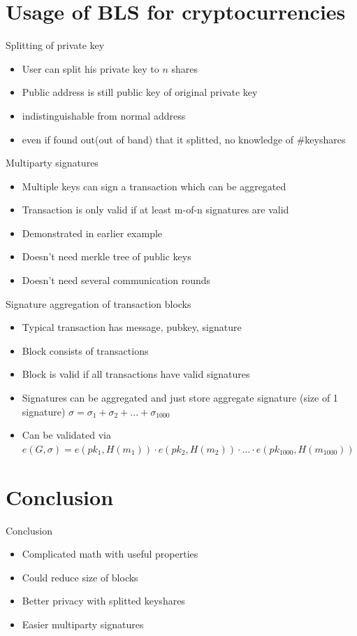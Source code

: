 \documentclass{beamer}
\begin{document}
\section{Usage of BLS for cryptocurrencies}
\begin{frame}{Splitting of private key}
	\begin{itemize}
		\item User can split his private key to $n$ shares
		\item Public address is still public key of original private key
		\item indistinguishable from normal address
		\item even if found out(out of band) that it splitted, no knowledge of \#keyshares
	\end{itemize}
\end{frame}
\begin{frame}{Multiparty signatures}
	\begin{itemize}
		\item Multiple keys can sign a transaction which can be aggregated
		\item Transaction is only valid if at least m-of-n signatures are valid
		\item Demonstrated in earlier example
		\item Doesn't need merkle tree of public keys
		\item Doesn't need several communication rounds
	\end{itemize}
\end{frame}
\begin{frame}{Signature aggregation of transaction blocks}
	\begin{itemize}
		\item Typical transaction has message, pubkey, signature
		\item Block consists of transactions
		\item Block is valid if all transactions have valid signatures
		\item Signatures can be aggregated and just store aggregate signature (size of 1 signature) \newline
		 $\sigma = \sigma_1 + \sigma_2 + ... + \sigma_{1000}$
		 \item Can be validated via \newline
		 $e(G,\sigma) = e(pk_1,H(m_1)) \cdot e(pk_2,H(m_2)) \cdot ... \cdot e(pk_{1000},H(m_{1000}))$
	\end{itemize}
\end{frame}
\section{Conclusion}
\begin{frame}{Conclusion}
	\begin{itemize}
		\item Complicated math with useful properties
		\item Could reduce size of blocks
		\item Better privacy with splitted keyshares
		\item Easier multiparty signatures
	\end{itemize}
\end{frame}
\end{document}
